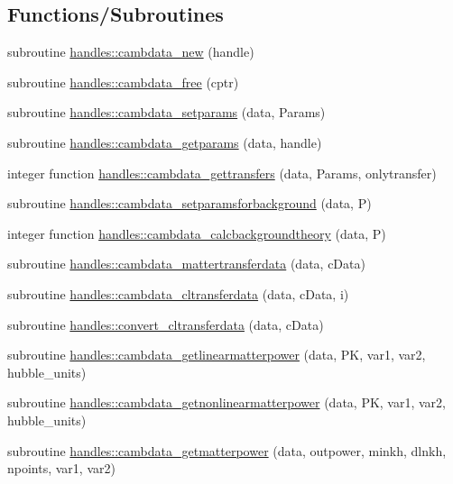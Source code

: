 \subsection*{Functions/\+Subroutines}
\begin{DoxyCompactItemize}
\item 
subroutine \mbox{\hyperlink{namespacehandles_a4de5423ef5a8e284a0571c62a0144917}{handles\+::cambdata\+\_\+new}} (handle)
\item 
subroutine \mbox{\hyperlink{namespacehandles_ab179d576d5e788ddc19e8a8c841aeade}{handles\+::cambdata\+\_\+free}} (cptr)
\item 
subroutine \mbox{\hyperlink{namespacehandles_a133fee834b72f96e030cb55f3c47d961}{handles\+::cambdata\+\_\+setparams}} (data, Params)
\item 
subroutine \mbox{\hyperlink{namespacehandles_a564998825329a378540701dda7e31957}{handles\+::cambdata\+\_\+getparams}} (data, handle)
\item 
integer function \mbox{\hyperlink{namespacehandles_a386ee0a28e6860d14047f052c918ca43}{handles\+::cambdata\+\_\+gettransfers}} (data, Params, onlytransfer)
\item 
subroutine \mbox{\hyperlink{namespacehandles_a4bdaf08397a5abc493ea901b3a53ece5}{handles\+::cambdata\+\_\+setparamsforbackground}} (data, P)
\item 
integer function \mbox{\hyperlink{namespacehandles_a2c10aa9ff66a25677588584f3fc4f2a3}{handles\+::cambdata\+\_\+calcbackgroundtheory}} (data, P)
\item 
subroutine \mbox{\hyperlink{namespacehandles_a98c230a0efe726b878c7efc4e95f6574}{handles\+::cambdata\+\_\+mattertransferdata}} (data, c\+Data)
\item 
subroutine \mbox{\hyperlink{namespacehandles_ab0bb10def620b06fb617f4704d9342d9}{handles\+::cambdata\+\_\+cltransferdata}} (data, c\+Data, i)
\item 
subroutine \mbox{\hyperlink{namespacehandles_abfc0adee06cc42379adb5fee674a9611}{handles\+::convert\+\_\+cltransferdata}} (data, c\+Data)
\item 
subroutine \mbox{\hyperlink{namespacehandles_accd4416ff2222813d3f9784504d7e5d8}{handles\+::cambdata\+\_\+getlinearmatterpower}} (data, PK, var1, var2, hubble\+\_\+units)
\item 
subroutine \mbox{\hyperlink{namespacehandles_a26542fd10068a2b3d57617a97f935286}{handles\+::cambdata\+\_\+getnonlinearmatterpower}} (data, PK, var1, var2, hubble\+\_\+units)
\item 
subroutine \mbox{\hyperlink{namespacehandles_a77db4a8f3a15895102aa6f7c7e49d5f8}{handles\+::cambdata\+\_\+getmatterpower}} (data, outpower, minkh, dlnkh, npoints, var1, var2)

\end{DoxyCompactItemize}
